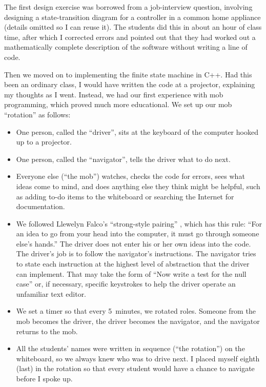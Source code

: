 \documentclass{article}
\begin{document}
The first design exercise was borrowed from a job-interview question,
involving designing a state-transition diagram for a controller in a common
home appliance (details omitted so I can reuse it). The students did this in
about an hour of class time, after which I corrected errors and pointed out
that they had worked out a mathematically complete description of the software
without writing a line of code.

Then we moved on to implementing the finite state machine in C++. Had this
been an ordinary class, I would have written the code at a projector,
explaining my thoughts as I went. Instead, we had our first experience with
mob programming, which proved much more educational. We set up our mob
``rotation'' as follows:

\begin{itemize}
\item One person, called the ``driver'', sits at the keyboard of the computer
hooked up to a projector.

\item One person, called the ``navigator'', tells the driver what to do next.

\item Everyone else (``the mob'') watches, checks the code for errors, sees
what ideas come to mind, and does anything else they think might be helpful,
such as adding to-do items to the whiteboard or searching the Internet for
documentation.

\item We followed Llewelyn Falco's ``strong-style
pairing'' \cite{falco2014strong}, which has this rule: ``For an idea to go from
your head into the computer, it must go through someone else's hands.'' The
driver does not enter his or her own ideas into the code. The driver's
job is to follow the navigator's instructions. The navigator tries to state
each instruction at the highest level of abstraction that the driver can
implement. That may take the form of ``Now write a test for the null case''
or, if necessary, specific keystrokes to help the driver operate an unfamiliar
text editor.


\item We set a timer so that every 5~minutes, we rotated roles. Someone from
the mob becomes the driver, the driver becomes the navigator, and the
navigator returns to the mob.

\item All the students' names were written in sequence (``the rotation'')
on the whiteboard, so we always knew who was to drive next. I placed myself
eighth (last) in the rotation so that every student would have a chance to
navigate before I spoke up.
\end{itemize}
\end{document}
